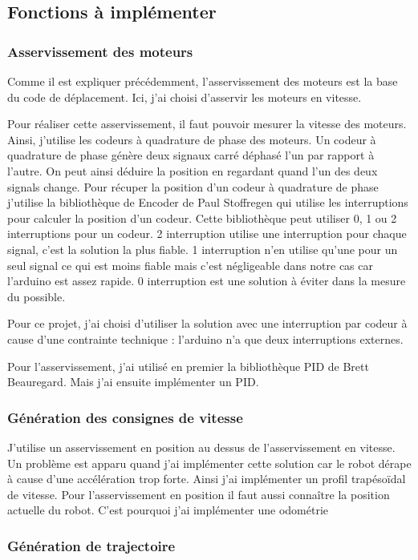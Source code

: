 \documentclass[12pt,a4paper]{report}
\begin{document}
    \subsection{Fonctions à implémenter}
      \subsubsection{Asservissement des moteurs}
        Comme il est expliquer précédemment, l'asservissement des moteurs est la base du code de déplacement. Ici, j'ai choisi d'asservir les moteurs en vitesse.

        Pour réaliser cette asservissement, il faut pouvoir mesurer la vitesse des moteurs. Ainsi, j'utilise les codeurs à quadrature de phase des moteurs.
        Un codeur à quadrature de phase génère deux signaux carré déphasé l'un par rapport à l'autre. On peut ainsi déduire la position en regardant quand l'un des deux signals change.
        Pour récuper la position d'un codeur à quadrature de phase j'utilise la bibliothèque de Encoder de Paul Stoffregen qui utilise les interruptions pour calculer la position d'un codeur. Cette bibliothèque peut utiliser 0, 1 ou 2 interruptions pour un codeur. 2 interruption utilise une interruption pour chaque signal, c'est la solution la plus fiable. 1 interruption n'en utilise qu'une pour un seul signal ce qui est moins fiable mais c'est négligeable dans notre cas car l'arduino est assez rapide. 0 interruption est une solution à éviter dans la mesure du possible.

        Pour ce projet, j'ai choisi d'utiliser la solution avec une interruption par codeur à cause d'une contrainte technique : l'arduino n'a que deux interruptions externes.

        Pour l'asservissement, j'ai utilisé en premier la bibliothèque PID de Brett Beauregard. Mais j'ai ensuite implémenter un PID.
      \subsubsection{Génération des consignes de vitesse}
        J'utilise un asservissement en position au dessus de l'asservissement en vitesse. Un problème est apparu quand j'ai implémenter cette solution car le robot dérape à cause d'une accélération trop forte. Ainsi j'ai implémenter un profil trapésoïdal de vitesse.
        Pour l'asservissement en position il faut aussi connaître la position actuelle du robot. C'est pourquoi j'ai implémenter une odométrie
      \subsubsection{Génération de trajectoire}
\end{document}

